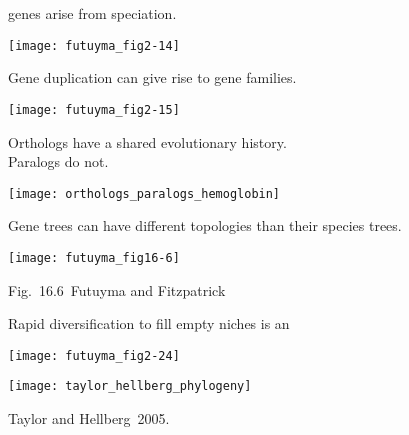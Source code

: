 \documentclass[t]{beamer}
\begin{document}
%
\begin{frame}[t,plain]{ genes arise from speciation.}

	\centering
	\vspace{-0.25\baselineskip}

	\texttt{[image: futuyma\_fig2-14]}

\end{frame}
%
\begin{frame}[t,plain]{Gene duplication can give rise to gene families.}

	\centering
	\vspace{-0.25\baselineskip}

	\texttt{[image: futuyma\_fig2-15]}

\end{frame}
%
%
\begin{frame}[t,plain]{Orthologs have a shared evolutionary history.\\ Paralogs do not.}

	\centering
	\vspace{-0.75\baselineskip}

	\texttt{[image: orthologs\_paralogs\_hemoglobin]}

\end{frame}
%
\begin{frame}[t,plain]{Gene trees can have different topologies than their species trees.}

	\centering

	\texttt{[image: futuyma\_fig16-6]}

	\vfilll
	
	\tiny \hfill Fig.~16.6 \textcopyright\,Futuyma and Fitzpatrick
\end{frame}
%
%
\begin{frame}[t,plain]{Rapid diversification to fill empty niches is an }

	\centering
	\vspace{-0.75\baselineskip}

	\texttt{[image: futuyma\_fig2-24]}

\end{frame}
%
\begin{frame}[t,plain]

	\centering

	\texttt{[image: taylor\_hellberg\_phylogeny]}
	
	\vfilll
	
	\tiny \hfill Taylor and Hellberg~2005.

\end{frame}
\end{document}
